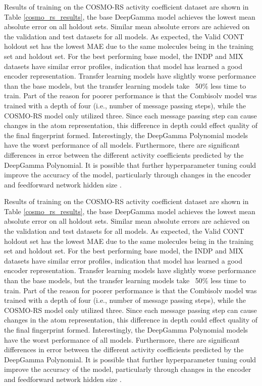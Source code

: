 Results of training on the COSMO-RS activity coefficient dataset are shown in Table \ref{cosmo_rs_results}, the base DeepGamma model achieves the lowest mean absolute error on all holdout sets. Similar mean absolute errors are achieved on the validation and test datasets for all models. As expected, the Valid CONT holdout set has the lowest MAE due to the same molecules being in the training set and holdout set.  For the best performing base model, the INDP and MIX datasets have similar error profiles, indication that model has learned a good encoder representation.  Transfer learning models have slightly worse performance than the base models, but the transfer learning models take ~50\% less time to train. Part of the reason for poorer performance is that the Combisolv model was trained with a depth of four (i.e., number of message passing steps), while the COSMO-RS model only utilized three. Since each message passing step can cause changes in the atom representation, this difference in depth could effect quality of the final fingerprint formed. Interestingly, the DeepGamma Polynomial models have the worst performance of all models. Furthermore, there are significant differences in error between the different activity coefficients predicted by the DeepGamma Polynomial.  It is possible that further hyperparameter tuning could improve the accuracy of the model, particularly through changes in the encoder and feedforward network hidden size \cite{Yang2019, Vermeire2021}.

Results of training on the COSMO-RS activity coefficient dataset are shown in Table \ref{cosmo_rs_results}, the base DeepGamma model achieves the lowest mean absolute error on all holdout sets. Similar mean absolute errors are achieved on the validation and test datasets for all models. As expected, the Valid CONT holdout set has the lowest MAE due to the same molecules being in the training set and holdout set.  For the best performing base model, the INDP and MIX datasets have similar error profiles, indication that model has learned a good encoder representation.  Transfer learning models have slightly worse performance than the base models, but the transfer learning models take ~50\% less time to train. Part of the reason for poorer performance is that the Combisolv model was trained with a depth of four (i.e., number of message passing steps), while the COSMO-RS model only utilized three. Since each message passing step can cause changes in the atom representation, this difference in depth could effect quality of the final fingerprint formed. Interestingly, the DeepGamma Polynomial models have the worst performance of all models. Furthermore, there are significant differences in error between the different activity coefficients predicted by the DeepGamma Polynomial.  It is possible that further hyperparameter tuning could improve the accuracy of the model, particularly through changes in the encoder and feedforward network hidden size \cite{Yang2019, Vermeire2021}.

